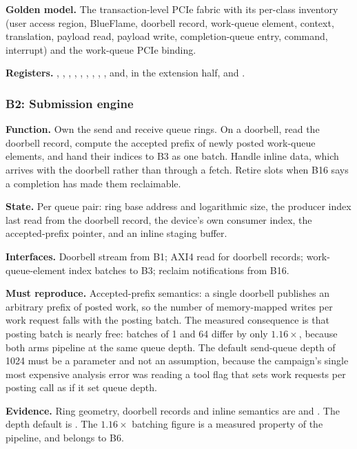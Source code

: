 \textbf{Golden model.} The transaction-level PCIe fabric with its per-class
inventory (user access region, BlueFlame, doorbell record, work-queue element,
context, translation, payload read, payload write, completion-queue entry,
command, interrupt) and the work-queue PCIe binding.

{\raggedright
\textbf{Registers.} , , ,
, ,
, ,
, , and, in the extension
half,  and .\par}

\subsubsection{B2: Submission engine}

\textbf{Function.} Own the send and receive queue rings. On a doorbell, read the
doorbell record, compute the accepted prefix of newly posted work-queue
elements, and hand their indices to B3 as one batch. Handle inline data, which
arrives with the doorbell rather than through a fetch. Retire slots when B16
says a completion has made them reclaimable.

\textbf{State.} Per queue pair: ring base address and logarithmic size, the
producer index last read from the doorbell record, the device's own consumer
index, the accepted-prefix pointer, and an inline staging buffer.

\textbf{Interfaces.} Doorbell stream from B1; AXI4 read for doorbell records;
work-queue-element index batches to B3; reclaim notifications from B16.

\textbf{Must reproduce.} Accepted-prefix semantics: a single doorbell publishes
an arbitrary prefix of posted work, so the number of memory-mapped writes per
work request falls with the posting batch. The measured consequence is that
posting batch is nearly free: batches of 1 and 64 differ by only $1.16\times$,
because both arms pipeline at the same queue depth. The default send-queue
depth of 1024 must be a parameter and not an assumption, because the campaign's
single most expensive analysis error was reading a tool flag that sets work
requests per posting call as if it set queue depth.

\textbf{Evidence.} Ring geometry, doorbell records and inline semantics are
\evdoc{} and \evdrv{}. The depth default is \evdrv{}. The $1.16\times$ batching
figure is a measured property of the pipeline, and belongs to B6.

